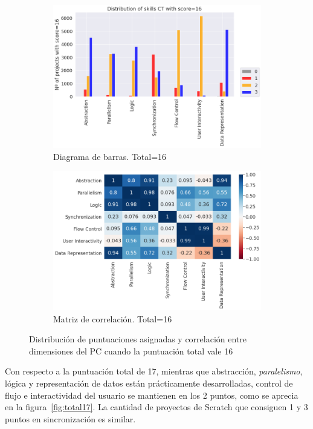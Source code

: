\documentclass[a4paper, 12pt]{book}
\begin{document}
\begin{figure}[H]
    \centering
    \begin{subfigure}[h]{.49\textwidth} 
        \includegraphics[width=\textwidth]{img/distribucion_16_Scratch}
        \caption{Diagrama de barras. Total=16}
        \label{fig:total16}
    \end{subfigure}       
    \begin{subfigure}[h]{.49\textwidth} 
        \includegraphics[width=\textwidth]{img/corr_16_Scratch}
        \caption{Matriz de correlación. Total=16}
        \label{fig:corr16}
    \end{subfigure}
     \caption{Distribución de puntuaciones asignadas y correlación entre dimensiones del PC cuando la puntuación total vale 16}
\end{figure}

Con respecto a la puntuación total de 17, mientras que abstracción, \emph{paralelismo}, lógica y representación de datos están prácticamente desarrolladas, control de flujo e interactividad del usuario se mantienen en los 2 puntos, como se aprecia en la figura~\ref{fig:total17}. La cantidad de proyectos de Scratch que consiguen 1 y 3 puntos en sincronización es similar.
\end{document}
